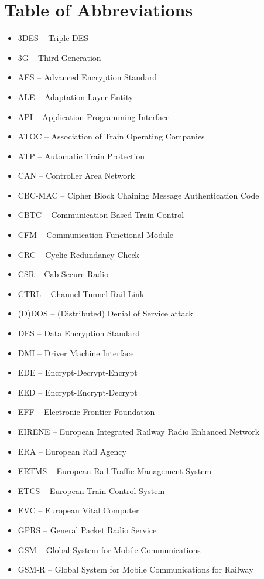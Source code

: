 \documentclass[twoside,11pt,a4paper]{article}
\begin{document}
\section*{Table of Abbreviations}
\begin{itemize}[nolistsep]
\item 3DES -- Triple DES
\item 3G -- Third Generation
\item AES -- Advanced Encryption Standard
\item ALE -- Adaptation Layer Entity
\item API -- Application Programming Interface
\item ATOC -- Association of Train Operating Companies
\item ATP -- Automatic Train Protection
\item CAN -- Controller Area Network
\item CBC-MAC -- Cipher Block Chaining Message Authentication Code
\item CBTC -- Communication Based Train Control
\item CFM -- Communication Functional Module
\item CRC -- Cyclic Redundancy Check
\item CSR -- Cab Secure Radio
\item CTRL -- Channel Tunnel Rail Link
\item (D)DOS -- (Distributed) Denial of Service attack
\item DES -- Data Encryption Standard
\item DMI -- Driver Machine Interface
\item EDE -- Encrypt-Decrypt-Encrypt
\item EED -- Encrypt-Encrypt-Decrypt
\item EFF -- Electronic Frontier Foundation
\item EIRENE -- European Integrated Railway Radio Enhanced Network
\item ERA -- European Rail Agency
\item ERTMS -- European Rail Traffic Management System
\item ETCS -- European Train Control System
\item EVC -- European Vital Computer
\item GPRS -- General Packet Radio Service
\item GSM -- Global System for Mobile Communications
\item GSM-R -- Global System for Mobile Communications for Railway

\end{itemize}
\end{document}
